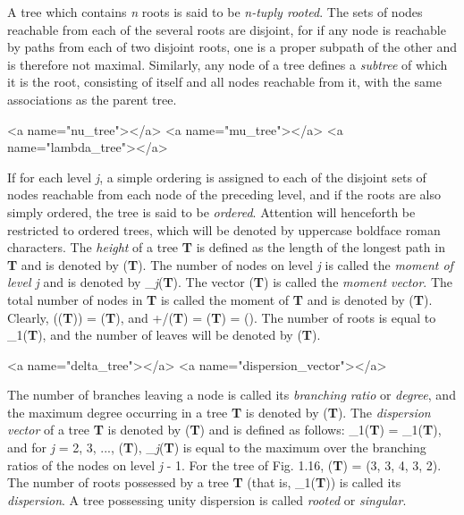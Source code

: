 {\par A tree which contains \textit{n} roots is said to be \textit{n-tuply rooted}. The sets of nodes reachable from each of the several roots are disjoint, for if any node is reachable by paths from each of two disjoint roots, one is a proper subpath of the other and is therefore not maximal. Similarly, any node of a tree defines a \textit{subtree} of which it is the root, consisting of itself and all nodes reachable from it, with the same associations as the parent tree.

<a name="nu_tree"></a>
<a name="mu_tree"></a>
<a name="lambda_tree"></a>
\par If for each level \textit{j}, a simple ordering is assigned to each of the disjoint sets of nodes reachable from each node of the preceding level, and if the roots are also simply ordered, the tree is said to be \textit{ordered}. Attention will henceforth be restricted to ordered trees, which will be denoted by uppercase boldface roman characters. The \textit{height} of a tree \textbf{T} is defined as the length of the longest path in \textbf{T} and is denoted by \textit{\nu}(\textbf{T}). The number of nodes on level \textit{j} is called the \textit{moment of level j} and is denoted by \textbf{\mu}_{\textit{j}}(\textbf{T}). The vector \textbf{\mu}(\textbf{T}) is called the \textit{moment vector}. The total number of nodes in \textbf{T} is called the moment of \textbf{T} and is denoted by \textit{\mu}(\textbf{T}). Clearly, \textit{\nu}(\textbf{\mu}(\textbf{T})) = \textit{\nu}(\textbf{T}), and +/\textbf{\mu}(\textbf{T}) = \textit{\mu}(\textbf{T}) = \textit{\nu}(). The number of roots is equal to 
\textbf{\mu}_{1}(\textbf{T}), and the number of leaves will be denoted by \textit{\lambda}(\textbf{T}).

<a name="delta_tree"></a>
<a name="dispersion_vector"></a>
\par The number of branches leaving a node is called its \textit{branching ratio} or \textit{degree}, and the maximum degree occurring in a tree \textbf{T} is denoted by \textit{\delta}(\textbf{T}). The \textit{dispersion vector} of a tree \textbf{T} is denoted by \textbf{\nu}(\textbf{T}) and is defined as follows: 
\textbf{\nu}_{1}(\textbf{T}) = \textbf{\mu}_{1}(\textbf{T}), and for \textit{j} = 2, 3, ..., \textit{\nu}(\textbf{T}), 
\textbf{\nu}_{\textit{j}}(\textbf{T}) is equal to the maximum over the branching ratios of the nodes on level 
\textit{j} - 1. For the tree of Fig. 1.16, 
\textbf{\nu}(\textbf{T}) = (3, 3, 4, 3, 2). The number of roots possessed by a tree \textbf{T} (that is, \textbf{\nu}_{1}(\textbf{T})) is called its \textit{dispersion}. A tree possessing unity dispersion is called 
\textit{rooted} or \textit{singular}.

}
